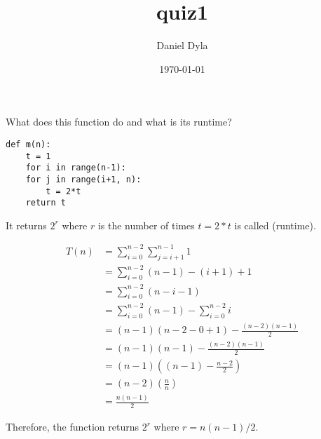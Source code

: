 \documentclass[11pt]{article}
\author{Daniel Dyla}
\date{\today}
\title{quiz1}
\begin{document}
\maketitle
\tableofcontents

What does this function do and what is its runtime?

\lstset{language=Python,label= ,caption= ,numbers=none}
\begin{lstlisting}
def m(n):
    t = 1
    for i in range(n-1):
	for j in range(i+1, n):
	    t = 2*t
    return t
\end{lstlisting}

It returns $2^{r}$ where $r$ is the number of times $t = 2*t$ is
called (runtime).

\begin{align}
  T(n) &= \sum_{i=0}^{n-2} \sum_{j=i+1}^{n-1} 1 \\
  &= \sum_{i=0}^{n-2} (n-1) - (i+1) + 1 \\
  &= \sum_{i=0}^{n-2} (n - i - 1) \\
  &= \sum_{i=0}^{n-2} (n - 1) - \sum_{i=0}^{n-2} i \\
  &= (n - 1)(n - 2 - 0 + 1) - \frac{(n-2)(n-1)}{2} \\
  &= (n - 1)(n - 1) - \frac{(n-2)(n-1)}{2} \\
  &= (n-1)((n-1) - \frac{n-2}{2}) \\
  &= (n-2)(\frac{n}{n}) \\
  &= \frac{n(n-1)}{2}
\end{align}

Therefore, the function returns $2^{r}$ where $r = n(n-1)/2$.
\end{document}
